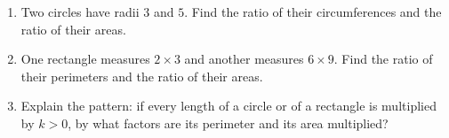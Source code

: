 \begin{enumerate}
\item[(a)] Two circles have radii $3$ and $5$. Find the ratio of their circumferences and the ratio of their areas.
\item[(b)] One rectangle measures $2\times3$ and another measures $6\times9$. Find the ratio of their perimeters and the ratio of their areas.
\item[(c)] Explain the pattern: if every length of a circle or of a rectangle is multiplied by $k>0$, by what factors are its perimeter and its area multiplied?
\end{enumerate}
